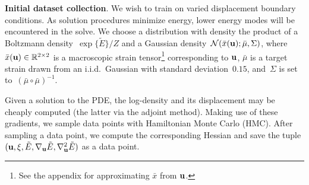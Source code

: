 \textbf{Initial dataset collection}.
We wish to train on varied displacement boundary conditions. As solution procedures minimize energy, lower energy modes will be encountered in the solve. We choose a distribution with density the product of a Boltzmann density~$\exp \{\tilde{E}\}/Z$ and a Gaussian density~$\mathcal{N}(\bar{x}({\mathbf{u}}); \bar{\mu}, \Sigma)$, where~${\bar{x}({\mathbf{u}}) \in \mathbb{R}^{2\times2}}$ is a macroscopic strain tensor\footnote{See the appendix for approximating $\bar{x}$ from ${\mathbf{u}}$.} corresponding to ${\mathbf{u}}$,
$\bar{\mu}$ is a target strain drawn from an i.i.d.\ Gaussian with standard deviation~$0.15$, and~$\Sigma$ is set to~$(\bar{\mu}\circ \bar{\mu})^{-1}$.

Given a solution to the PDE, the log-density and its displacement may be cheaply computed (the latter via the adjoint method). Making use of these gradients, we sample data points with Hamiltonian Monte Carlo (HMC). After sampling a data point, we compute the corresponding Hessian and save the tuple $({\mathbf{u}}, \xi, \tilde{E}, \nabla_{{\mathbf{u}}} \tilde{E}, \nabla^2_{{\mathbf{u}}} \tilde{E})$ as a data point.

